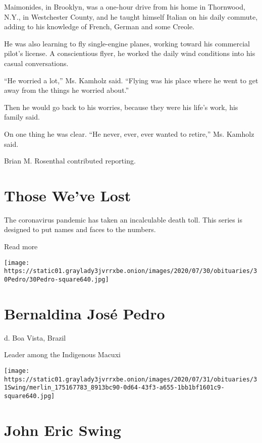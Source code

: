 Maimonides, in Brooklyn, was a one-hour drive from his home in
Thornwood, N.Y., in Westchester County, and he taught himself Italian on
his daily commute, adding to his knowledge of French, German and some
Creole.

He was also learning to fly single-engine planes, working toward his
commercial pilot's license. A conscientious flyer, he worked the daily
wind conditions into his casual conversations.

``He worried a lot,'' Ms. Kamholz said. ``Flying was his place where he
went to get away from the things he worried about.''

Then he would go back to his worries, because they were his life's work,
his family said.

On one thing he was clear. ``He never, ever, ever wanted to retire,''
Ms. Kamholz said.

Brian M. Rosenthal contributed reporting.

\href{https://www.nytimes3xbfgragh.onion/interactive/2020/obituaries/people-died-coronavirus-obituaries.html?action=click\&pgtype=Article\&state=default\&region=BELOW_MAIN_CONTENT\&context=covid_obits_promo}{}

\hypertarget{those-weve-lost}{%
\section{Those We've Lost}\label{those-weve-lost}}

The coronavirus pandemic has taken an incalculable death toll. This
series is designed to put names and faces to the numbers.

Read more

\texttt{[image: https://static01.graylady3jvrrxbe.onion/images/2020/07/30/obituaries/30Pedro/30Pedro-square640.jpg]}

\hypertarget{bernaldina-josuxe9-pedro}{%
\section{Bernaldina José Pedro}\label{bernaldina-josuxe9-pedro}}

d. Boa Vista, Brazil

Leader among the Indigenous Macuxi

\texttt{[image: https://static01.graylady3jvrrxbe.onion/images/2020/07/31/obituaries/31Swing/merlin\_175167783\_8913bc90-0d64-43f3-a655-1bb1bf1601c9-square640.jpg]}

\hypertarget{john-eric-swing}{%
\section{John Eric Swing}\label{john-eric-swing}}


